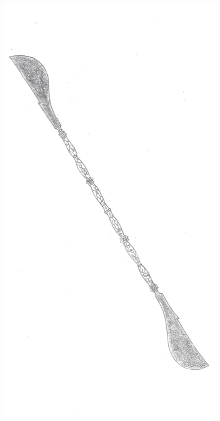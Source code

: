 \begin{figure}[b]
\begin{minipage}{0.3\linewidth}
    \end{minipage}
    \begin{minipage}{0.3\linewidth}
    \centering
    \includegraphics[width=\textwidth]{illustrations/toran_endurium.jpg}
    \end{minipage}
    \begin{minipage}{0.3\linewidth}

\end{minipage}
\end{figure}
